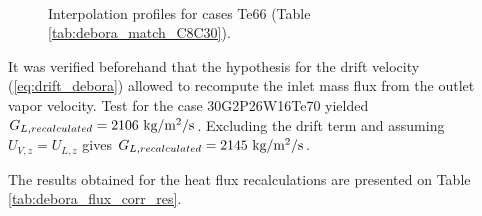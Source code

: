 \begin{figure}[h!]
\centering

\\

\caption{Interpolation profiles for cases Te66 (Table \ref{tab:debora_match_C8C30}).}
\label{fig:debora_interpol}
\end{figure}

\begin{remark*}{}
It was verified beforehand that the hypothesis for the drift velocity (\ref{eq:drift_debora}) allowed to recompute the inlet mass flux from the outlet vapor velocity. Test for the case 30G2P26W16Te70 yielded $G_{L,recalculated}=2106~\text{kg/m$^{2}$/s}$. Excluding the drift term and assuming $U_{V,z}=U_{L,z}$ gives $G_{L,recalculated}=2145~\text{kg/m$^{2}$/s}$.
\end{remark*}


The results obtained for the heat flux recalculations are presented on Table \ref{tab:debora_flux_corr_res}.

